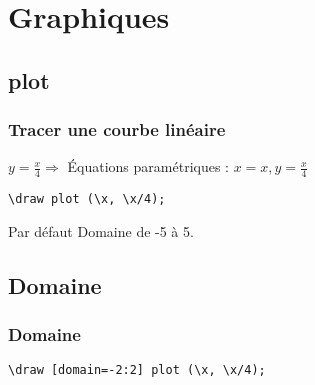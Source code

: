 \documentclass{clic_latex_beamer}
\begin{document}

\section{Graphiques}
\subsection{plot}
\begin{frame}[fragile]
\frametitle{Tracer une courbe linéaire}
$y=\frac{x}{4} \Rightarrow$ Équations paramétriques : $ x=x, y=\frac{x}{4}$

\pause

\begin{lstlisting}
\draw plot (\x, \x/4);
\end{lstlisting}

\pause


\pause

\begin{block}{Par défaut}
 Domaine de -5 à 5.
\end{block}

\end{frame}

\subsection{Domaine}
\begin{frame}[fragile]
\frametitle{Domaine}

\begin{lstlisting}
\draw [domain=-2:2] plot (\x, \x/4);
\end{lstlisting}


\end{frame}
\end{document}
